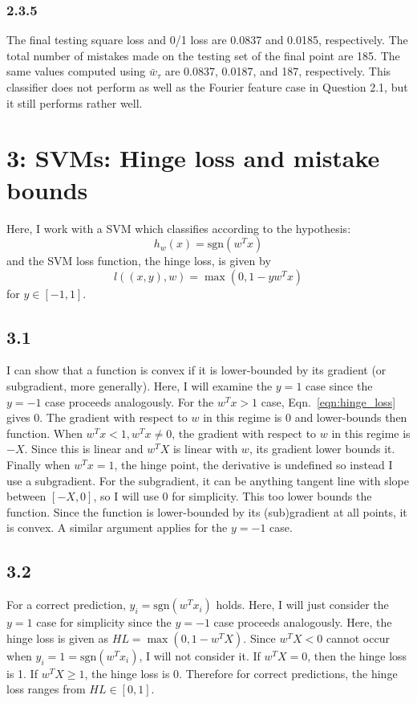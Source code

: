 \documentclass[12pt]{amsart}
\begin{document}
\subsubsection*{2.3.5}
The final testing square loss and 0/1 loss are 0.0837 and 0.0185, respectively.  The total number of mistakes made on the testing set of the final point are 185.  The same values computed using $\bar{w}_{\tau}$ are 0.0837, 0.0187, and 187, respectively.   This classifier does not perform as well as the Fourier feature case in Question 2.1, but it still performs rather well.

\section*{3: SVMs: Hinge loss and mistake bounds}

Here, I work with a SVM which classifies according to the hypothesis:
\begin{equation} \label{eqn:svm}
h_w(x) = \text{sgn}(w^Tx)
\end{equation}
and the SVM loss function, the hinge loss, is given by
\begin{equation} \label{eqn:hinge_loss}
l((x,y),w) = \max(0,1 - yw^Tx)
\end{equation}
for $y \in [-1,1]$.

\subsection*{3.1}

I can show that a function is convex if it is lower-bounded by its gradient (or subgradient, more generally).  Here, I will examine the $y = 1$ case since the $y = -1$ case proceeds analogously.   For the $w^Tx > 1$ case, Eqn.~\ref{eqn:hinge_loss} gives 0.  The gradient with respect to $w$ in this regime is 0 and lower-bounds then function.  When $w^Tx < 1, w^Tx \neq 0$, the gradient with respect to $w$ in this regime is $-X$.  Since this is linear and $w^TX$ is linear with $w$, its gradient lower bounds it.  Finally when $w^Tx = 1$, the hinge point, the derivative is undefined so instead I use a subgradient.  For the subgradient, it can be anything tangent line with slope between $[-X,0]$, so I will use 0 for simplicity.  This too lower bounds the function.  Since the function is lower-bounded by its (sub)gradient at all points, it is convex.  A similar argument applies for the $y = -1$ case.

\subsection*{3.2}
For a correct prediction, $y_i = \text{sgn}(w^Tx_i)$ holds.  Here, I will just consider the $y = 1$ case for simplicity since the $y = -1$ case proceeds analogously.  Here, the hinge loss is given as $HL = \max(0,1-w^TX)$.  Since $w^TX < 0$ cannot occur when $y_i = 1 = \text{sgn}(w^Tx_i)$, I will not consider it.  If $w^TX = 0$, then the hinge loss is 1.  If $w^TX \geq 1$, the hinge loss is 0.  Therefore for correct predictions, the hinge loss ranges from $HL \in [0,1]$.
\end{document}
